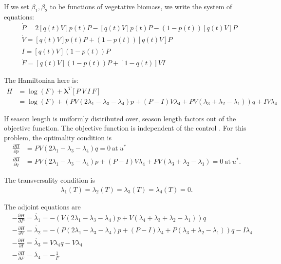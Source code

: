 \documentclass[12pt, oneside]{article}   	%
\begin{document}
If we set $\beta_1, \beta_2$ to be functions of vegetative biomass, we write the system of equations:
%
\begin{align}
& \dot{P}  = 2 [q(t) V] p(t) P - [q(t) V] p(t) P - ( 1-p(t) ) [q(t) V] P \nonumber \\
& \dot{V} = [q(t) V] p(t) P + ( 1-p(t) ) [q(t) V] P \nonumber \\
& \dot{I}  = [q(t) V] ( 1-p(t) ) P \nonumber \\ 
& \dot{F}  = [q(t) V] ( 1-p(t) ) P + [1-q(t)] V I
\end{align}

The Hamiltonian here is:
%
\begin{align}
H & = \log( F ) + \bm{\lambda}^T [P\ V\ I\ F] \\
& = \log( F ) + \left(PV \left(2\lambda_1 -\lambda_3-\lambda_4 \right)p+\left(P-I\right)V\lambda_4+PV (
\lambda_3+\lambda_2-\lambda_1) \right)q+I
 V\lambda_4
\end{align}

If season length is uniformly distributed over, season length factors out of the objective function. The objective function is independent of the control . For this problem, the optimality condition is 
%
\begin{align}
\frac{\partial H}{\partial p} & = PV (2\lambda_1 - \lambda_3-\lambda_4 )q = 0\ \mathrm{at}\ u^* \nonumber \\
\frac{\partial H}{\partial q} & = PV( 2 \lambda_1 - \lambda_3- \lambda_4 )p+(P-I)V \lambda_4+PV (
 \lambda_3+\lambda_2-\lambda_1) = 0\ \mathrm{at}\ u^*.
\end{align}

The transversality condition is
\begin{align}
\lambda_1(T) = \lambda_2(T) = \lambda_3(T) = \lambda_4(T) = 0.
\end{align}

The adjoint equations are
%
\begin{align}
&-\frac{\partial H}{\partial P} = \dot{\lambda_1}  = -( V(2 \lambda_1 - \lambda_3 - \lambda_4)p+V ( \lambda_4+\lambda_3+ \lambda_2 - \lambda_1) )q \nonumber \\
&-\frac{\partial H}{\partial V} = \dot{\lambda_2}  =  -( P ( 2 \lambda_1 - \lambda_3 - \lambda_4 ) p+ ( P-I ) \lambda_4 +P ( \lambda_3+ \lambda_2- \lambda_1) ) q - I \lambda_4 \nonumber \\
&-\frac{\partial H}{\partial I} = \dot{\lambda_3}  = V \lambda_4 q - V \lambda_4  \nonumber \\
&-\frac{\partial H}{\partial F} = \dot{\lambda_4}  = - \frac{1}{F}
\end{align}
\end{document}
